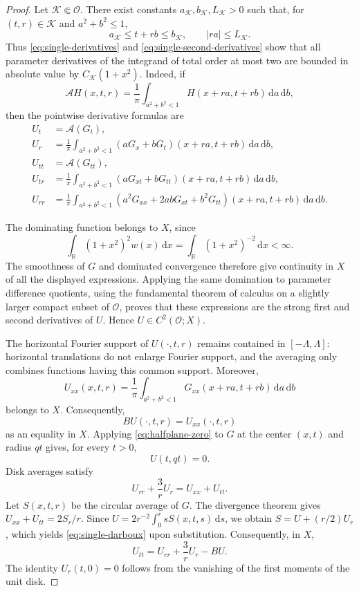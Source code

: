 \documentclass[10pt,a4paper]{amsart}
\newcommand{\dd}{\,\mathrm d}
\begin{document}
\begin{proof}
Let $\mathcal K\Subset\mathcal O$. There exist constants
$a_{\mathcal K},b_{\mathcal K},L_{\mathcal K}>0$ such that,
for $(t,r)\in\mathcal K$ and $a^2+b^2\le1$,
\[
a_{\mathcal K}\le t+rb\le b_{\mathcal K},
\qquad |ra|\le L_{\mathcal K}.
\]
Thus \eqref{eq:single-derivatives} and
\eqref{eq:single-second-derivatives} show that all parameter
derivatives of the integrand of total order at most two
are bounded in absolute value by $C_{\mathcal K}(1+x^2)$.
Indeed, if
\[
\mathcal A H(x,t,r)
=\frac1\pi\int_{a^2+b^2<1}
H(x+ra,t+rb)\dd a\dd b,
\]
then the pointwise derivative formulas are
\begin{align*}
U_t&=\mathcal A(G_t),\\
U_r&=\frac1\pi\int_{a^2+b^2<1}
       (aG_x+bG_t)(x+ra,t+rb)\dd a\dd b,\\
U_{tt}&=\mathcal A(G_{tt}),\\
U_{tr}&=\frac1\pi\int_{a^2+b^2<1}
       (aG_{xt}+bG_{tt})(x+ra,t+rb)\dd a\dd b,\\
U_{rr}&=\frac1\pi\int_{a^2+b^2<1}
       (a^2G_{xx}+2abG_{xt}+b^2G_{tt})
       (x+ra,t+rb)\dd a\dd b.
\end{align*}

The dominating function belongs to $X$, since
\[
\int_{\mathbb R}(1+x^2)^2w(x)\dd x
=
\int_{\mathbb R}(1+x^2)^{-2}\dd x<\infty.
\]
The smoothness of $G$ and dominated convergence therefore
give continuity in $X$ of all the displayed expressions.
Applying the same domination to parameter difference
quotients, using the fundamental theorem of calculus on
a slightly larger compact subset of $\mathcal O$, proves
that these expressions are the strong first and second
derivatives of $U$. Hence $U\in C^2(\mathcal O;X)$.

The horizontal Fourier support of $U(\cdot,t,r)$ remains
contained in $[-\Lambda,\Lambda]$: horizontal translations
do not enlarge Fourier support, and the averaging only
combines functions having this common support.
Moreover,
\[
U_{xx}(x,t,r)
=\frac1\pi\int_{a^2+b^2<1}
G_{xx}(x+ra,t+rb)\dd a\dd b
\]
belongs to $X$. Consequently,
\[
BU(\cdot,t,r)=U_{xx}(\cdot,t,r)
\]
as an equality in $X$. Applying \eqref{eq:halfplane-zero} to $G$ at the center $(x,t)$ and radius
$qt$ gives, for every $t>0$,
\begin{equation}\label{eq:single-movingboundary}
U(t,qt)=0.
\end{equation}
Disk averages satisfy
\begin{equation}\label{eq:single-darboux}
U_{rr}+\frac3rU_r=U_{xx}+U_{tt}.
\end{equation}
Let $S(x,t,r)$ be the circular average of $G$. The divergence theorem gives
$U_{xx}+U_{tt}=2S_r/r$.
Since $U=2r^{-2}\int_0^r sS(x,t,s)\dd s$, we obtain
$S=U+(r/2)U_r$, which yields \eqref{eq:single-darboux} upon substitution.
Consequently, in $X$,
\begin{equation}\label{eq:single-wave}
U_{tt}=U_{rr}+\frac3rU_r-BU.
\end{equation}
The identity $U_r(t,0)=0$ follows from the vanishing of the first moments of the unit disk.


\end{proof}
\end{document}
